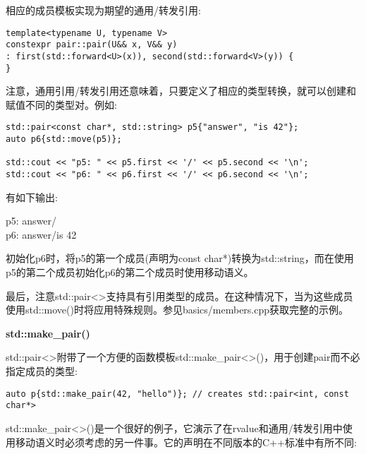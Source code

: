 相应的成员模板实现为期望的通用/转发引用:\par

\begin{lstlisting}[caption={}]
template<typename U, typename V>
constexpr pair::pair(U&& x, V&& y)
: first(std::forward<U>(x)), second(std::forward<V>(y)) {
}
\end{lstlisting}

注意，通用引用/转发引用还意味着，只要定义了相应的类型转换，就可以创建和赋值不同的类型对。例如:\par

\begin{lstlisting}[caption={}]
std::pair<const char*, std::string> p5{"answer", "is 42"};
auto p6{std::move(p5)};

std::cout << "p5: " << p5.first << '/' << p5.second << '\n';
std::cout << "p6: " << p6.first << '/' << p6.second << '\n';
\end{lstlisting}

有如下输出:\par

\begin{tcolorbox}[colback=white,colframe=black]
p5: answer/ \\
p6: answer/is 42
\end{tcolorbox}

初始化p6时，将p5的第一个成员(声明为const char*)转换为std::string，而在使用p5的第二个成员初始化p6的第二个成员时使用移动语义。\par

最后，注意std::pair<>支持具有引用类型的成员。在这种情况下，当为这些成员使用std::move()时将应用特殊规则。参见basics/members.cpp获取完整的示例。\par

\hspace*{\fill} \par %
\textbf{std::make\_pair()}

std::pair<>附带了一个方便的函数模板std::make\_pair<>()，用于创建pair而不必指定成员的类型:\par

\begin{lstlisting}[caption={}]
auto p{std::make_pair(42, "hello")}; // creates std::pair<int, const char*>
\end{lstlisting}

std::make\_pair<>()是一个很好的例子，它演示了在rvalue和通用/转发引用中使用移动语义时必须考虑的另一件事。它的声明在不同版本的C++标准中有所不同:\par


